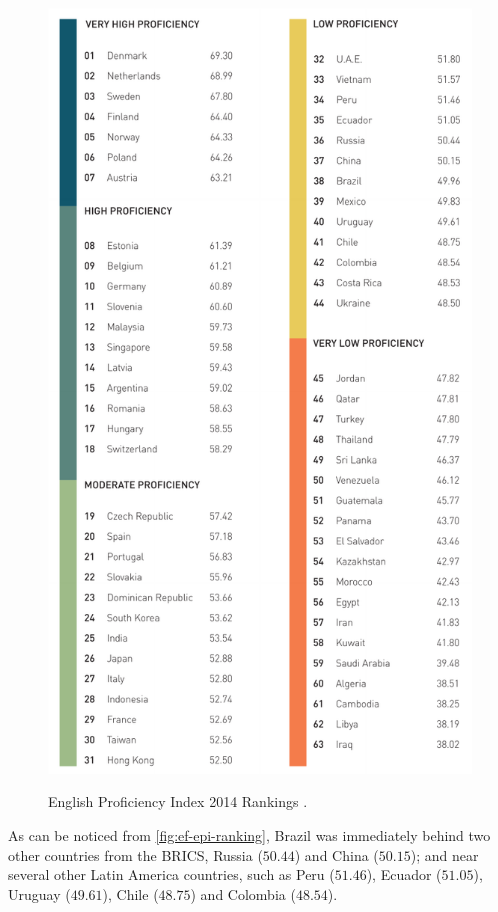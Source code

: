 \begin{figure}[!htpb]
        {\includegraphics[width=1.0\linewidth]{gfx/ef-epi-ranking-2014.pdf}}
        \caption{English Proficiency Index 2014 Rankings \cite{EF2014}.}
        \label{fig:ef-epi-ranking}
\end{figure}

As can be noticed from \autoref{fig:ef-epi-ranking}, Brazil was immediately behind two other countries from the BRICS, Russia ($50.44$) and China ($50.15$); and near several other Latin America countries, such as Peru ($51.46$), Ecuador ($51.05$), Uruguay ($49.61$), Chile ($48.75$) and Colombia ($48.54$). 

